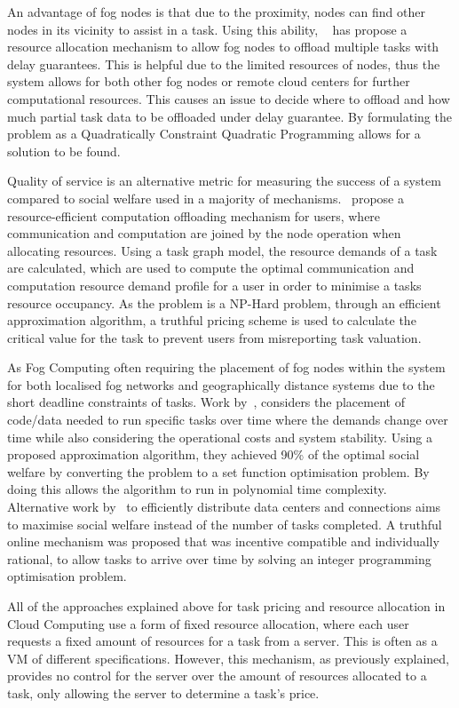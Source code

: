 An advantage of fog nodes is that due to the proximity, nodes can find other nodes in its vicinity to assist in a task.
Using this ability, ~\cite{8839780} has propose a resource allocation mechanism to allow fog nodes to offload multiple
tasks with delay guarantees. This is helpful due to the limited resources of nodes, thus the system allows for
both other fog nodes or remote cloud centers for further computational resources. This causes an issue to decide where
to offload and how much partial task data to be offloaded under delay guarantee. By formulating the problem as a
Quadratically Constraint Quadratic Programming allows for a solution to be found.

Quality of service is an alternative metric for measuring the success of a system compared to social welfare used in a
majority of mechanisms.~\cite{8379445} propose a resource-efficient computation offloading mechanism for users, where
communication and computation are joined by the node operation when allocating resources. Using a task graph model, the
resource demands of a task are calculated, which are used to compute the optimal communication and computation resource
demand profile for a user in order to minimise a tasks resource occupancy. As the problem is a NP-Hard problem, through an
efficient approximation algorithm, a truthful pricing scheme is used to calculate the critical value for the task to
prevent users from misreporting task valuation.

As Fog Computing often requiring the placement of fog nodes within the system for both localised fog networks and
geographically distance systems due to the short deadline constraints of tasks. Work by~\cite{vaji_infocom}, considers
the placement of code/data needed to run specific tasks over time where the demands change over time while also
considering the operational costs and system stability. Using a proposed approximation algorithm, they achieved 90\% of
the optimal social welfare by converting the problem to a set function optimisation problem. By doing this allows the
algorithm to run in polynomial time complexity. \\
Alternative work by~\cite{Bi2019} to efficiently distribute data centers and connections aims to maximise social
welfare instead of the number of tasks completed. A truthful online mechanism was proposed that was incentive compatible and individually rational, to allow
tasks to arrive over time by solving an integer programming optimisation problem.

All of the approaches explained above for task pricing and resource allocation in Cloud Computing use a form of fixed resource
allocation, where each user requests a fixed amount of resources for a task from a server. This is often as a VM of different specifications. However, this
mechanism, as previously explained, provides no control for the server over the amount of resources allocated to a
task, only allowing the server to determine a task's price.

